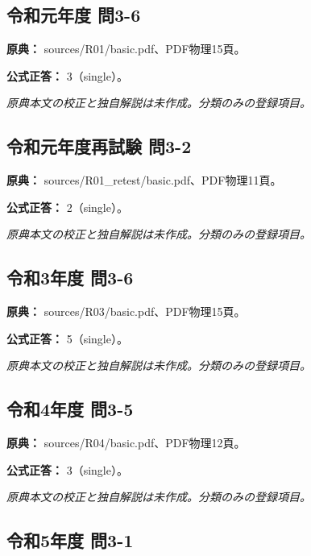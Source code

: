\subsection{令和元年度 問3-6}
\label{q:r01-reg-basic-3-6}

\noindent\textbf{原典：} sources/R01/basic.pdf、PDF物理15頁。

\textbf{公式正答：} 3（single）。

\par\textit{原典本文の校正と独自解説は未作成。分類のみの登録項目。}

\subsection{令和元年度再試験 問3-2}
\label{q:r01-ret-basic-3-2}

\noindent\textbf{原典：} sources/R01\_retest/basic.pdf、PDF物理11頁。

\textbf{公式正答：} 2（single）。

\par\textit{原典本文の校正と独自解説は未作成。分類のみの登録項目。}

\subsection{令和3年度 問3-6}
\label{q:r03-reg-basic-3-6}

\noindent\textbf{原典：} sources/R03/basic.pdf、PDF物理15頁。

\textbf{公式正答：} 5（single）。

\par\textit{原典本文の校正と独自解説は未作成。分類のみの登録項目。}

\subsection{令和4年度 問3-5}
\label{q:r04-reg-basic-3-5}

\noindent\textbf{原典：} sources/R04/basic.pdf、PDF物理12頁。

\textbf{公式正答：} 3（single）。

\par\textit{原典本文の校正と独自解説は未作成。分類のみの登録項目。}

\subsection{令和5年度 問3-1}
\label{q:r05-reg-basic-3-1}

